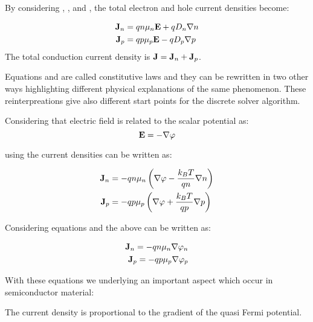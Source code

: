 By considering , ,  and , the total electron and hole current densities become:

\begin{align}
\mathbf{J}_n &= qn\mu_n\mathbf{E} + qD_n\nabla n  \label{eq: drift diff electron}\\ 
\mathbf{J}_p &= qp\mu_p\mathbf{E} - qD_p \nabla p \label{eq: drift diff hole}
\end{align}
The total conduction current density is $\mathbf{J}=\mathbf{J}_n+\mathbf{J}_p$.

Equations  and  are called constitutive laws and they can be rewritten in two other ways highlighting different physical explanations of the same phenomenon. These reinterpreations give also different start points for the discrete solver algorithm.

Considering that electric field is related to the scalar potential as:
\begin{equation}
\label{eq: relazione pot electric}
\mathbf{E}  = -\nabla \varphi
\end{equation}

using  the current densities can be written as:

\begin{align}
\mathbf{J}_n &= -qn\mu_n\left(\nabla \varphi - \dfrac{k_BT}{qn}\nabla n \right) \label{eq: Jn DD} \\ 
\mathbf{J}_p &= -qp\mu_p\left(\nabla \varphi+ \dfrac{k_BT}{qp} \nabla p \right) \label{eq: Jp DD}
\end{align}

Considering equations  and  the above can be written as:

\begin{align}
\mathbf{J}_n = -qn\mu_n\nabla \varphi_n \label{eq: Jn qf}\\
\mathbf{J}_p = -qp\mu_p\nabla \varphi_p \label{eq: Jp qf}
\end{align}

With these equations we underlying an important aspect which occur in semiconductor material:
\begin{Osservazione}
The current density is proportional to the gradient of the quasi Fermi potential.
\end{Osservazione}

